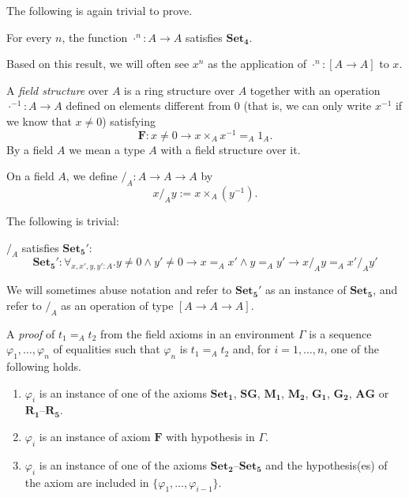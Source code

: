 \documentclass[numreferences]{kluwer}
\newcommand{\axiom}[1]{\ensuremath{\mathbf{#1}}}
\begin{document}
\begin{article}
The following is again trivial to prove.
\begin{proposition} For every $n$, the function $\cdot^n:A\to A$ satisfies
\axiom{Set_4}.
\end{proposition}

Based on this result, we will often see $x^n$ as the application of
$\cdot^n:[A\to A]$ to $x$.

\begin{definition}
A \emph{field structure} over $A$ is a ring structure over $A$ together with
an operation $\cdot^{-1}:A\to A$ defined on elements different from $0$
(that is, we can only write $x^{-1}$ if we know that $x\neq 0$)
satisfying
\[\axiom{F} : x\neq 0 \to x\times_A x^{-1}=_A 1_A.\]
By a field $A$ we mean a type $A$ with a field structure over it.
\end{definition}

\begin{definition} On a field $A$, we define
$/_A:A\to A\to A$ by \[x/_A y:= x\times_A(y^{-1}).\]
\end{definition}

The following is trivial:

\begin{proposition} $/_A$ satisfies \axiom{Set_5'}:
\[
\axiom{Set_5'} : \forall_{x,x',y,y':A}.
 y\neq 0\wedge y'\neq 0\to x=_A x'\wedge y=_A y'\to x/_A y=_A x'/_A y'
\]
\end{proposition}
We will sometimes abuse notation and refer to \axiom{Set_5'} as an
instance of \axiom{Set_5}, and refer to $/_A$ as an operation of type
$[A\to A\to A]$.

\begin{definition}\label{defn:proof} A \emph{proof} of $t_1=_A t_2$ from
the field axioms in an environment $\Gamma$ is a sequence
$\varphi_1,\ldots,\varphi_n$ of equalities such that $\varphi_n$ is
$t_1=_A t_2$ and, for $i=1,\ldots,n$, one of the following holds.
\begin{enumerate}[--]
\item $\varphi_i$ is an instance of one of the axioms \axiom{Set_1},
\axiom{SG}, \axiom{M_1}, \axiom{M_2}, \axiom{G_1}, \axiom{G_2},
\axiom{AG} or \axiom{R_1}--\axiom{R_5}.
\item $\varphi_i$ is an instance of axiom \axiom{F} with hypothesis
in $\Gamma$.
\item $\varphi_i$ is an instance of one of the axioms
\axiom{Set_2}--\axiom{Set_5} and the hypothesis(es) of the axiom are
included in $\{\varphi_1,\ldots,\varphi_{i-1}\}$.
\end{enumerate}
\end{definition}


\end{article}
\end{document}
